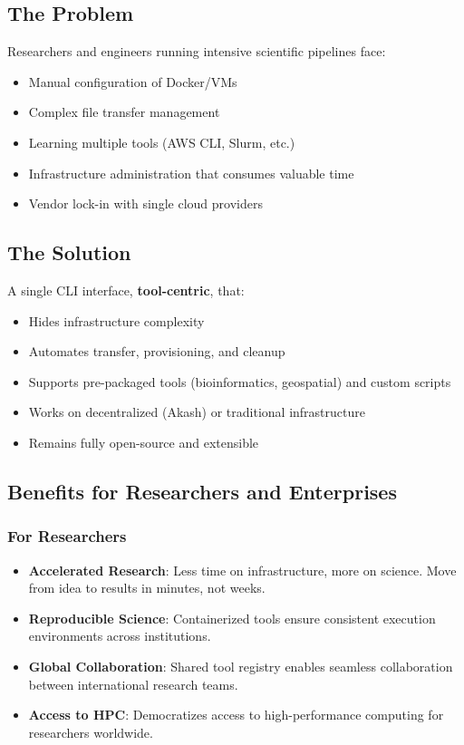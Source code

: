 \documentclass[11pt,a4paper]{article}
\newcommand{\highlight}[1]{\textbf{\color{darkblue}#1}}
\begin{document}
	\subsection{The Problem}
	
	Researchers and engineers running intensive scientific pipelines face:
	
	\begin{itemize}
		\item Manual configuration of Docker/VMs
		\item Complex file transfer management
		\item Learning multiple tools (AWS CLI, Slurm, etc.)
		\item Infrastructure administration that consumes valuable time
		\item Vendor lock-in with single cloud providers
	\end{itemize}
	
	\subsection{The Solution}
	
	A single CLI interface, \highlight{tool-centric}, that:
	
	\begin{itemize}
		\item Hides infrastructure complexity
		\item Automates transfer, provisioning, and cleanup
		\item Supports pre-packaged tools (bioinformatics, geospatial) and custom scripts
		\item Works on decentralized (Akash) or traditional infrastructure
		\item Remains fully open-source and extensible
	\end{itemize}
	
	\subsection{Benefits for Researchers and Enterprises}
	
	\subsubsection{For Researchers}
	
	\begin{itemize}
		\item \textbf{Accelerated Research}: Less time on infrastructure, more on science. Move from idea to results in minutes, not weeks.
		\item \textbf{Reproducible Science}: Containerized tools ensure consistent execution environments across institutions.
		\item \textbf{Global Collaboration}: Shared tool registry enables seamless collaboration between international research teams.
		\item \textbf{Access to HPC}: Democratizes access to high-performance computing for researchers worldwide.
	\end{itemize}
	
\end{document}
